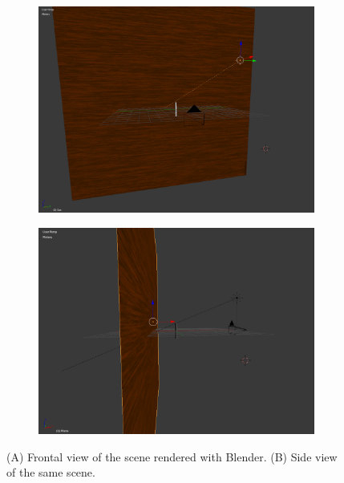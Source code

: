 \begin{figure}[htbp]
    \begin{subfigure}[b]{0.5\textwidth}
        \includegraphics[width=\textwidth]{./Template_Figures/blender_scene}
        \caption{\label{fig:blender_scene}}
    \end{subfigure}
    \begin{subfigure}[b]{0.5\textwidth}
        \includegraphics[width=\textwidth]{./Template_Figures/blender_scene_side}
        \caption{\label{fig:blender_scene_side}}
    \end{subfigure}
    \caption{(A) Frontal view of the scene rendered with Blender. (B) Side view of the same scene.\label{fig:Scene_conf}}
\end{figure}

